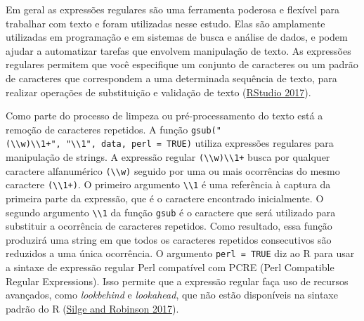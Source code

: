 \documentclass[preprint, 3p,
authoryear]{elsarticle} %
\begin{document}
Em geral as expressões regulares são uma ferramenta poderosa e flexível
para trabalhar com texto e foram utilizadas nesse estudo. Elas são
amplamente utilizadas em programação e em sistemas de busca e análise de
dados, e podem ajudar a automatizar tarefas que envolvem manipulação de
texto. As expressões regulares permitem que você especifique um conjunto
de caracteres ou um padrão de caracteres que correspondem a uma
determinada sequência de texto, para realizar operações de substituição
e validação de texto (\protect\hyperlink{ref-RStudio2017}{RStudio
2017}).

Como parte do processo de limpeza ou pré-processamento do texto está a
remoção de caracteres repetidos. A função
\texttt{gsub("(\textbackslash{}\textbackslash{}w)\textbackslash{}\textbackslash{}1+",\ "\textbackslash{}\textbackslash{}1",\ data,\ perl\ =\ TRUE)}
utiliza expressões regulares para manipulação de strings. A expressão
regular
\texttt{(\textbackslash{}\textbackslash{}w)\textbackslash{}\textbackslash{}1+}
busca por qualquer caractere alfanumérico
\texttt{(\textbackslash{}\textbackslash{}w)} seguido por uma ou mais
ocorrências do mesmo caractere
\texttt{(\textbackslash{}\textbackslash{}1+)}. O primeiro argumento
\texttt{\textbackslash{}\textbackslash{}1} é uma referência à captura da
primeira parte da expressão, que é o caractere encontrado inicialmente.
O segundo argumento \texttt{\textbackslash{}\textbackslash{}1} da função
\texttt{gsub} é o caractere que será utilizado para substituir a
ocorrência de caracteres repetidos. Como resultado, essa função
produzirá uma string em que todos os caracteres repetidos consecutivos
são reduzidos a uma única ocorrência. O argumento \texttt{perl\ =\ TRUE}
diz ao R para usar a sintaxe de expressão regular Perl compatível com
PCRE (Perl Compatible Regular Expressions). Isso permite que a expressão
regular faça uso de recursos avançados, como \emph{lookbehind} e
\emph{lookahead}, que não estão disponíveis na sintaxe padrão do R
(\protect\hyperlink{ref-Silge2017}{Silge and Robinson 2017}).
\end{document}
